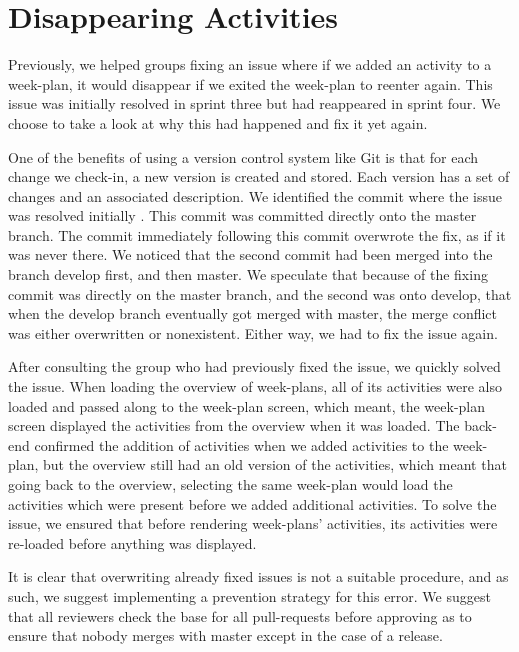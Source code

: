 \section{Disappearing Activities}

Previously, we helped groups fixing an issue where if we added an activity to a week-plan, it would disappear if we exited the week-plan to reenter again. This issue was initially resolved in sprint three but had reappeared in sprint four. We choose to take a look at why this had happened and fix it yet again.

One of the benefits of using a version control system like Git is that for each change we check-in, a new version is created and stored. Each version has a set of changes and an associated description. We identified the commit where the issue was resolved initially \cite{weekplan_issue_257_fix}. This commit was committed directly onto the master branch. The commit immediately following this commit \cite{weekplan_issue_257_fix-2}  overwrote the fix, as if it was never there. We noticed that the second commit had been merged into the branch develop first, and then master. We speculate that because of the fixing commit was directly on the master branch, and the second was onto develop, that when the develop branch eventually got merged with master, the merge conflict was either overwritten or nonexistent. Either way, we had to fix the issue again. 

After consulting the group who had previously fixed the issue, we quickly solved the issue. When loading the overview of week-plans, all of its activities were also loaded and passed along to the week-plan screen, which meant, the week-plan screen displayed the activities from the overview when it was loaded. The back-end confirmed the addition of activities when we added activities to the week-plan, but the overview still had an old version of the activities, which meant that going back to the overview, selecting the same week-plan would load the activities which were present before we added additional activities. To solve the issue, we ensured that before rendering week-plans' activities, its activities were re-loaded before anything was displayed.

It is clear that overwriting already fixed issues is not a suitable procedure, and as such, we suggest implementing a prevention strategy for this error. We suggest that all reviewers check the base for all pull-requests before approving as to ensure that nobody merges with master except in the case of a release.
